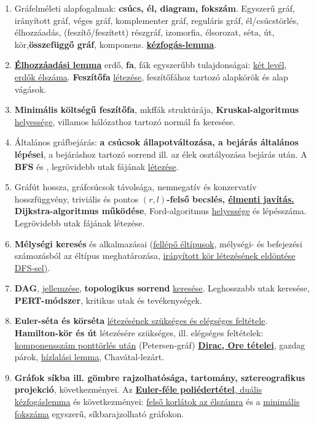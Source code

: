 \documentclass[10pt]{article}
\begin{document}
        \begin{enumerate}
            \item Gráfelméleti alapfogalmak: \textbf{csúcs, él, diagram, fokszám}. Egyszerű gráf, irányított gráf, véges gráf, komplementer gráf, reguláris gráf, él/csúcstörlés, élhozzáadás, (feszítő/feszített) részgráf, izomorfia, élsorozat, séta, út, kör,\textbf{összefüggő gráf}, komponens. \underline{\textbf{kézfogás-lemma}}.
            \item \underline{\textbf{Élhozzáadási lemma}} erdő, \textbf{fa}, fák egyszerűbb tulajdonságai: \underline{két levél}, \underline{erdők élszáma}. \textbf{Feszítőfa} \underline{létezése}, feszítőfához tartozó alapkörök és alap vágások.
            \item \textbf{Minimális költségű feszítőfa}, mkffák struktúrája, \textbf{Kruskal-algoritmus} \underline{helyessége}, villamos hálózathoz tartozó normál fa keresése.
            \item Általános gráfbejárás: \textbf{a csúcsok állapotváltozása, a bejárás általános lépései}, a bejáráshoz tartozó sorrend ill. az élek osztályozása bejárás után. A \textbf{BFS} és , legrövidebb utak fájának \underline{létezése}.
            \item Gráfút hossza, gráfcsúcsok távolsága, nemnegatív és konzervatív hosszfüggvény, triviális és pontos $(r,l)$\textbf{-felső becslés, \underline{élmenti javítás.} Dijkstra-algoritmus működése}, Ford-algoritmus \underline{helyessége} és lépésszáma. Legrövidebb utak fájának létezése.
            \item \textbf{Mélységi keresés} és alkalmazásai (\underline{fellépő éltípusok}, mélységi- és befejezési számozásból az éltípus meghatározása, \underline{irányított kör létezésének eldöntése DFS-sel)}.
            \item \textbf{DAG}, \underline{jellemzése}, \textbf{topologikus sorrend} \underline{keresése}. Leghosszabb utak keresése, \textbf{PERT-módszer}, kritikus utak és tevékenységek.
            \item \textbf{Euler-séta és körséta} \underline{létezésének szükséges és elégséges feltétele}. \textbf{Hamilton-kör és út} létezésére szükséges, ill. elégséges feltételek: \underline{komponensszám ponttörlés után} (Petersen-gráf) \underline{\textbf{Dirac, Ore tételei}}, gazdag párok, \underline{hízlalási lemma}, Chavátal-lezárt.
            \item \textbf{Gráfok síkba ill. gömbre rajzolhatósága, tartomány, sztereografikus projekció}, következményei. Az \underline{\textbf{Euler-féle poliédertétel}, duális kézfogáslemma} és következményei: \underline{felső korlátok az élszámra} és a \underline{minimális fokszáma} egyszerű, síkbarajzolható gráfokon.

\end{enumerate}
\end{document}
